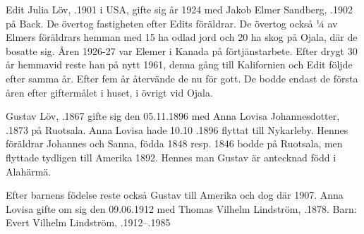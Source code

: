 Edit Julia Löv, .1901 i USA, gifte sig år 1924 med Jakob Elmer Sandberg, .1902 på Back. De övertog fastigheten efter Edits föräldrar. De övertog också ¼ av Elmers föräldrars hemman med 15 ha odlad jord och 20 ha skog på Ojala, där de bosatte sig. Åren 1926-27 var Elemer i Kanada på förtjänstarbete. Efter drygt 30 år hemmavid reste han på nytt 1961, denna gång till Kalifornien och Edit följde efter samma år. Efter fem år återvände de nu för gott. De bodde endast de första åren efter giftermålet i huset, i övrigt vid Ojala.
\begin{jhchildren}
  \item {}
  \item {}
  \item {}
\end{jhchildren}


Gustav Löv, .1867 gifte sig den 05.11.1896 med Anna Lovisa Johannesdotter, .1873 på Ruotsala. Anna Lovisa hade 10.10 .1896 flyttat till Nykarleby. Hennes föräldrar Johannes och Sanna, födda 1848 resp. 1846 bodde på Ruotsala, men flyttade tydligen till Amerika 1892. Hennes man Gustav är antecknad född i Alahärmä.
\begin{jhchildren}
  \item {}
  \item {}
  \item {}
  \item {}
\end{jhchildren}

Efter barnens födelse reste också Gustav till Amerika och dog där 1907. Anna Lovisa gifte om sig den 09.06.1912 med Thomas Vilhelm Lindström, .1878.
Barn: Evert Vilhelm Lindström, .1912--.1985






